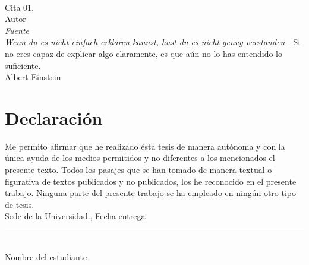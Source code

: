 \documentclass[12pt,spanish,fleqn,openany,twoside,letterpaper]{book}
\newcommand{\studentname}{}
\newcommand{\submissiondate}{}
\newcommand{\resgroupone}{}
\newcommand{\resgrouptwo}{}
\newcommand{\researchtopic}{}
\newcommand{\issuedate}{}
\newcommand{\sede}{}
\newcommand{\department}{}
\newcommand{\faculty}{}
\newcommand{\university}{Universidad Nacional de Colombia}
\renewcommand{\studentname}{Nombre del estudiante}
\renewcommand{\issuedate}{Año entrega}
\renewcommand{\submissiondate}{Fecha entrega}
\renewcommand{\resgroupone}{Grupo A (Sigla Grupo Investigación 01) }
\renewcommand{\resgrouptwo}{Grupo B (Sigla Grupo Investigación 02) }
\renewcommand{\researchtopic}{Línea}
\renewcommand{\sede}{Sede de la Universidad}
\renewcommand{\department}{Departamento}
\renewcommand{\faculty}{Facultad}
\begin{document}
{\begin{center}
\end{center}

\newpage
\thispagestyle{empty}
\begin{flushright}
\begin{minipage}{12.5cm}
\noindent
\\[10em]
{\Large Cita 01.}
\\[3em]
Autor
\\ \textit{Fuente}
\\[10em]
{\Large \textit{Wenn du es nicht einfach erkl\"{a}ren kannst, hast du es nicht genug verstanden} - Si no eres capaz de explicar algo claramente, es que aún no lo has entendido lo suficiente.}
\\[3em]
Albert Einstein
\end{minipage}
\end{flushright} 

\newpage
\chapter*{\sffamily Declaración}
\par Me permito afirmar que he realizado ésta tesis de manera autónoma y con la única ayuda de los medios permitidos y no diferentes a los mencionados el presente texto. Todos los pasajes que se han tomado de manera textual o figurativa de textos publicados y no publicados, los he reconocido en el presente trabajo. Ninguna parte del presente trabajo se ha empleado en ningún otro tipo de tesis. 
\\[1em]
\sede., \submissiondate
\\[6em]
\rule{6cm}{0.5pt}\\
\studentname
}

{\pagestyle{plain} 
\setlength{\parskip}{1mm}





}
\end{document}
